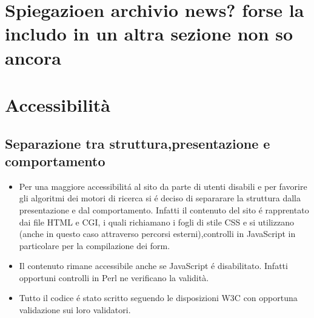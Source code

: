 \documentclass[12pt]{article}
\begin{document}
	\section{Spiegazioen archivio news? forse la includo in un altra sezione non so ancora}
			

\newpage

	\newpage
		\section{Accessibilit\`a}
		\subsection{Separazione tra struttura,presentazione e comportamento}
		\begin{itemize}
			\item Per una maggiore accessibilit\'a al sito da parte di utenti disabili e per favorire gli algoritmi dei motori di ricerca si \'e deciso di separarare la struttura dalla presentazione e dal comportamento.
			Infatti il contenuto del sito \'e rapprentato dai file HTML e CGI, i quali richiamano i fogli di stile CSS e si utilizzano (anche in questo caso attraverso percorsi esterni),controlli in JavaScript in particolare per la compilazione dei form. 

			\item Il contenuto rimane accessibile anche se JavaScript \'e disabilitato. Infatti opportuni controlli in Perl ne verificano la validit\`a.

			\item Tutto il codice \'e stato scritto seguendo le disposizioni W3C con opportuna validazione sui loro validatori.
		\end{itemize}
\end{document}
